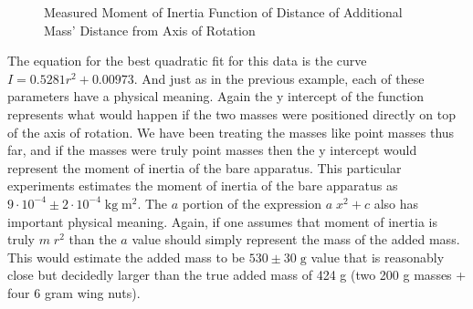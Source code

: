 \documentclass[11pt]{article}
\begin{document}
\begin{figure}[h]
	\centering
	\caption{Measured Moment of Inertia Function of Distance of Additional Mass' Distance from Axis of Rotation}
\end{figure}
The equation for the best quadratic fit for this data is the curve \(I = 0.5281 r^2 + 0.00973\). And just as in the previous example, each of these parameters have a physical meaning. Again the y intercept of the function represents what would happen if the two masses were positioned directly on top of the axis of rotation. We have been treating the masses like point masses thus far, and if the masses were truly point masses then the y intercept would represent the moment of inertia of the bare apparatus. This particular experiments estimates the moment of inertia of the bare apparatus as  \(9 \cdot 10^{-4} \pm 2 \cdot 10 ^{-4}  \; \mathrm{kg} \; \mathrm{m}^2 \). The \(a\) portion of the expression \(a \; x^2 + c\) also has important physical meaning. Again, if one assumes that moment of inertia is truly \(m \; r^2 \) than the \(a\) value should simply represent the mass of the added mass. This would estimate the added mass to be \( 530 \pm 30 \; \mathrm{g} \) value that is reasonably close but decidedly larger than the true added mass of 424 g (two 200 g masses + four 6 gram wing nuts).
\end{document}
